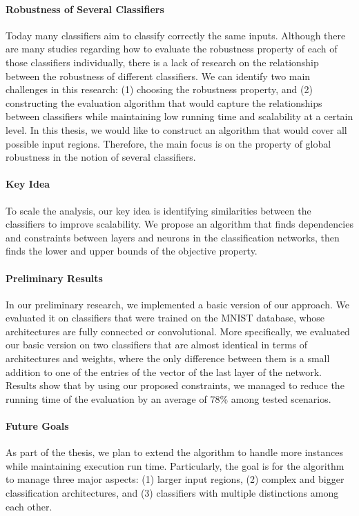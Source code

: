 \paragraph{Robustness of Several Classifiers}
Today many classifiers aim to classify correctly the same inputs. Although there are many studies regarding how to evaluate the robustness property of each of those classifiers individually, there is a lack of research on the relationship between the robustness of different classifiers. We can identify two main challenges in this research: (1) choosing the robustness property, and (2) constructing the evaluation algorithm that would capture the relationships between classifiers while maintaining low running time and scalability at a certain level. In this thesis, we would like to construct an algorithm that would cover all possible input regions. Therefore, the main focus is on the property of global robustness in the notion of several classifiers.


\paragraph{Key Idea}
To scale the analysis, our key idea is identifying similarities between the classifiers to improve scalability.
We propose an algorithm that finds dependencies and constraints between layers and neurons in the classification networks, then finds the lower and upper bounds of the objective property.


\paragraph{Preliminary Results}
In our preliminary research, we implemented a basic version of our approach. We evaluated it on classifiers that were trained on the MNIST database, whose architectures are fully connected or convolutional. More specifically, we evaluated our basic version on two classifiers that are almost identical in terms of architectures and weights, where the only difference between them is a small addition to one of the entries of the vector of the last layer of the network. Results show that by using our proposed constraints, we managed to reduce the running time of the evaluation by an average of 78\% among tested scenarios.


\paragraph{Future Goals}
As part of the thesis, we plan to extend the algorithm to handle more instances while maintaining execution run time. Particularly, the goal is for the algorithm to manage three major aspects: (1) larger input regions, (2) complex and bigger classification architectures, and (3) classifiers with multiple distinctions among each other. 